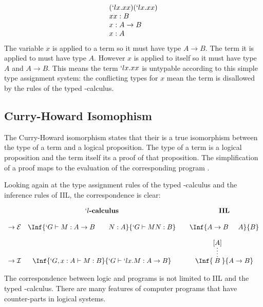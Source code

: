   \begin{example}
  \[  
  \begin{array}{lr}
    (`lx.xx)(`lx.xx) \\
    xx : B \\
    x : A \to B \\
    x : A
  \end{array}
  \]
  The variable $x$ is applied to a term so it must have type $A \to B$.
  The term it is applied to must have type $A$.
  However $x$ is applied to itself so it must have type $A$ and $A \to B$.
  This means the term $`lx.xx$ is untypable according to this simple type assignment system:
  the conflicting types for $x$ mean the term is disallowed by the rules of the typed \lam-calculus.
  \end{example}
 
  \subsection{Curry-Howard Isomophism}
  
  The Curry-Howard isomorphism states that their is a true isomorphism between the type of a term and a logical proposition. 
  The type of a term is a logical proposition and the term itself its a proof of that proposition.
  The simplification of a proof maps to the evaluation of the corresponding program \cite{Wadler15}.
  
  Looking again at the type assignment rules of the typed \lam-calculus and the inference rules of IIL,
  the correspondence is clear:
  
  \[
  \begin{array}{cc@{\quad\quad}c}
    & `l\textbf{-calculus} & \textbf{IIL}
    \\
    \\
    \to\mathcal{E} 
    &
    \Inf{ `G \vdash M : A \to B \hspace{20pt} N:A }
        { `G \vdash M N : B }
    &
    \Inf{ A \to B \hspace{0.5cm} A }
        {B}
    \\
    \\
    \to\mathcal{I} 
    &
    \Inf{ `G,x:A \vdash M : B }
      { `G \vdash `lx.M : A \to B }
    &
    \Inf{ \infer*{B}{[A]} }
        { A \to B}
   \\
    \end{array}
  \]
 
  The correspondence between logic and programs is not limited to IIL and the typed \lam-calculus.
  There are many features of computer programs that have counter-parts in logical systems.

